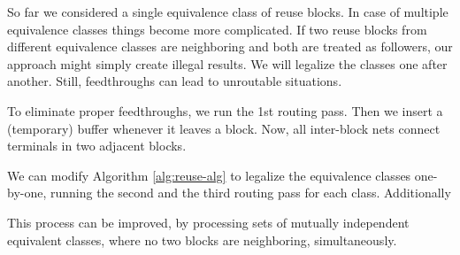 \documentclass[a2paper]{bigsposter}
\newcommand{\emptybox}[2]{\framebox[#1]{\rule{0pt}{#2}}}
\begin{document}
\begin{blockrow}

	

\label{sec:multiple-equivalent classes}
So far we considered  a single equivalence class of reuse blocks.
In case of multiple equivalence classes things become more complicated.
If two reuse blocks from different equivalence classes are neighboring
and both are treated as followers, our approach might simply create illegal
results.
We will legalize the classes one after another.
Still, feedthroughs can lead to unroutable situations.

To eliminate proper feedthroughs, we run the 1st routing pass. Then
we insert a (temporary) buffer whenever it leaves a block. 
Now, all inter-block nets connect terminals in two adjacent blocks.

We can modify Algorithm \ref{alg:reuse-alg} to legalize the equivalence
classes one-by-one, running the second and the third routing pass for
each class. Additionally 

This process can be improved, by processing sets of mutually
independent equivalent classes, where no two blocks are neighboring,
simultaneously.
	
  \end{blockrow}

%	
	  
\end{document}
